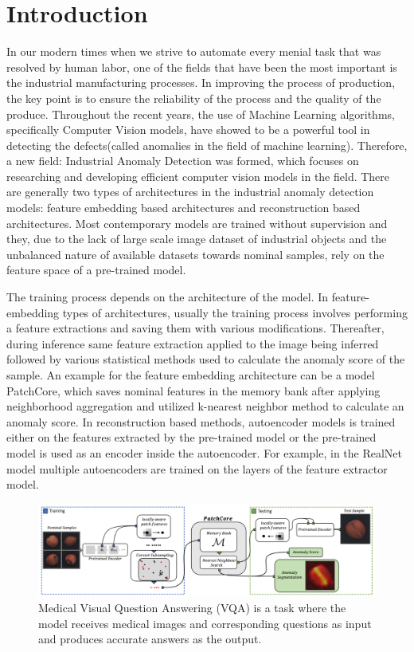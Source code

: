 \chapter{Introduction}
\label{chapter:intro}

In our modern times when we strive to automate every menial task that was resolved by human labor, one of the fields that have been the most important is the industrial manufacturing processes. In improving the process of production, the key point is to ensure the reliability of the process and the quality of the produce. Throughout the recent years, the use of Machine Learning algorithms, specifically Computer Vision models, have showed to be a powerful tool in detecting the defects(called anomalies in the field of machine learning). Therefore, a new field: Industrial Anomaly Detection was formed, which focuses on researching and developing efficient computer vision models in the field. There are generally two types of architectures in the industrial anomaly detection models: feature embedding based architectures and reconstruction based architectures. Most contemporary models are trained without supervision and they, due to the lack of large scale image dataset of industrial objects and the unbalanced nature of available datasets towards nominal samples, rely on the feature space of a pre-trained model.

The training process depends on the architecture of the model. In feature-embedding types of architectures, usually the training process involves performing a feature extractions and saving them with various modifications. Thereafter, during inference same feature extraction applied to the image being inferred followed by various statistical methods used to calculate the anomaly score of the sample. An example for the feature embedding architecture can be a model PatchCore, which saves nominal features in the memory bank after applying neighborhood aggregation and utilized k-nearest neighbor method to calculate an anomaly score. In reconstruction based methods, autoencoder models is trained either on the features extracted by the pre-trained model or the pre-trained model is used as an encoder inside the autoencoder. For example, in the RealNet model multiple autoencoders are trained on the layers of the feature extractor model. 

\begin{figure}[h]
\begin{center}
\includegraphics[width=1.0\linewidth]{Chapter_1/patchcore.png}
\end{center}
\caption{Medical Visual Question Answering (VQA) \cite{liu2021slake} is a task where the model receives medical images and corresponding questions as input and produces accurate answers as the output.}
\label{fig:patchcore}
\end{figure}

